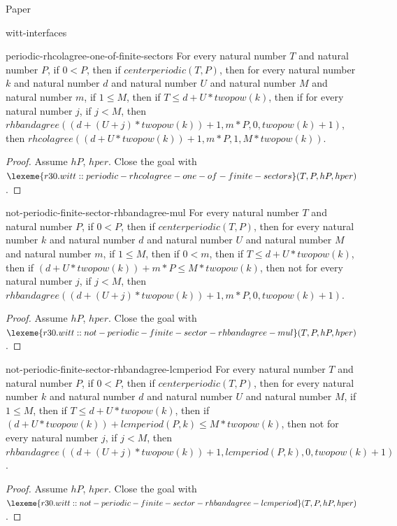 \begin{lexlean}{Paper}
\begin{section}{witt-interfaces}
  \begin{theorem}{periodic-rhcolagree-one-of-finite-sectors}
  For every natural number \(T\) and natural number \(P\), if \(0 < P\), then if \(centerperiodic(T, P)\), then for every natural number \(k\) and natural number \(d\) and natural number \(U\) and natural number \(M\) and natural number \(m\), if \(1 ≤ M\), then if \(T ≤ d + U * twopow(k)\), then if for every natural number \(j\), if \(j < M\), then \(rhbandagree((d + (U + j) * twopow(k)) + 1, m * P, 0, twopow(k) + 1)\), then \(rhcolagree((d + U * twopow(k)) + 1, m * P, 1, M * twopow(k))\).
  \begin{proof}
  Assume \(hP\), \(hper\).
  Close the goal with \(\lexeme{r30.witt::periodic-rhcolagree-one-of-finite-sectors}(T, P, hP, hper)\).
  \end{proof}
  \end{theorem}

  \begin{theorem}{not-periodic-finite-sector-rhbandagree-mul}
  For every natural number \(T\) and natural number \(P\), if \(0 < P\), then if \(centerperiodic(T, P)\), then for every natural number \(k\) and natural number \(d\) and natural number \(U\) and natural number \(M\) and natural number \(m\), if \(1 ≤ M\), then if \(0 < m\), then if \(T ≤ d + U * twopow(k)\), then if \((d + U * twopow(k)) + m * P ≤ M * twopow(k)\), then not for every natural number \(j\), if \(j < M\), then \(rhbandagree((d + (U + j) * twopow(k)) + 1, m * P, 0, twopow(k) + 1)\).
  \begin{proof}
  Assume \(hP\), \(hper\).
  Close the goal with \(\lexeme{r30.witt::not-periodic-finite-sector-rhbandagree-mul}(T, P, hP, hper)\).
  \end{proof}
  \end{theorem}

  \begin{theorem}{not-periodic-finite-sector-rhbandagree-lcmperiod}
  For every natural number \(T\) and natural number \(P\), if \(0 < P\), then if \(centerperiodic(T, P)\), then for every natural number \(k\) and natural number \(d\) and natural number \(U\) and natural number \(M\), if \(1 ≤ M\), then if \(T ≤ d + U * twopow(k)\), then if \((d + U * twopow(k)) + lcmperiod(P, k) ≤ M * twopow(k)\), then not for every natural number \(j\), if \(j < M\), then \(rhbandagree((d + (U + j) * twopow(k)) + 1, lcmperiod(P, k), 0, twopow(k) + 1)\).
  \begin{proof}
  Assume \(hP\), \(hper\).
  Close the goal with \(\lexeme{r30.witt::not-periodic-finite-sector-rhbandagree-lcmperiod}(T, P, hP, hper)\).
  \end{proof}
  \end{theorem}


\end{section}
\end{lexlean}
